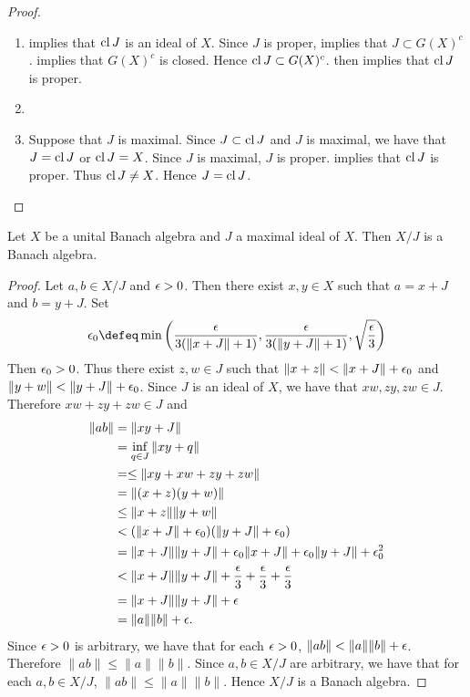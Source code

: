 \documentclass{book}
\begin{document}
	\begin{proof}\
		\begin{enumerate}
			\item {} \rex{} implies that $\operatorname{cl} J$ is an ideal of $X$. Since $J$ is proper,  \rex{} implies that $J \subset G(X)^c$.  implies that $G(X)^c$ is closed. Hence $\operatorname{cl} J \subset G(X)^c$.  \rex{} then implies that $\operatorname{cl} J$ is proper.
			\item \tcr{zorn's lemma FINISH!!!}
			\item Suppose that $J$ is maximal. Since $J \subset \operatorname{cl} J$ and $J$ is maximal, we have that $J = \operatorname{cl} J$ or $\operatorname{cl} J = X$. Since $J$ is maximal, $J$ is proper.  implies that $\operatorname{cl} J$ is proper. Thus $\operatorname{cl} J \neq X$. Hence $J = \operatorname{cl} J$.
		\end{enumerate}
	\end{proof}

	\begin{ex}
		Let $X$ be a unital Banach algebra and $J$ a maximal ideal of $X$. Then $X/J$ is a Banach algebra.
	\end{ex}

	\begin{proof}
		Let $a,b \in X/J$ and $\epsilon > 0$. Then there exist $x,y \in X$ such that $a = x+J$ and $b = y+J$. Set 
		$$\ep_0 \defeq \min \bigg( \frac{\ep}{3 (\|x + J\| + 1)}, \frac{\ep}{3 (\|y + J\| + 1)}, \sqrt{\frac{\ep}{3}} \bigg)$$ 
		Then $\epsilon_0 > 0$. Thus there exist $z,w \in J$ such that $\|x + z\| < \|x + J\| + \epsilon_0$ and $\|y + w\| < \|y + J\| + \epsilon_0$. Since $J$ is an ideal of $X$, we have that $xw, zy, zw \in J$. Therefore $xw + zy + zw \in J$ and 
		\begin{align*}
			\|ab\|
			& = \|xy + J\| \\
			& = \inf_{q \in J} \|xy + q \| \\
			& = \leq \|xy + xw + zy + zw \| \\
			& = \|(x + z)(y + w) \| \\
			& \leq \|x+z\| \|y+w\| \\
			& < (\|x + J\| + \epsilon_0) (\|y + J\| + \epsilon_0) \\
			& = \|x + J\| \|y + J\| + \epsilon_0\|x + J\| + \epsilon_0 \|y + J\| + \epsilon_0^2 \\
			& < \|x + J\| \|y + J\| + \frac{\epsilon}{3} + \frac{\epsilon}{3} + \frac{\epsilon}{3} \\
			& = \|x + J\| \|y + J\| + \epsilon \\
			& = \|a\| \|b\| + \epsilon. 
		\end{align*}
		Since $\epsilon > 0$ is arbitrary, we have that for each $\epsilon >0$, $\|ab\| < \|a\| \|b\| + \epsilon$. Therefore $\|ab\| \leq \|a\| \|b\|$. Since $a,b \in X/J$ are arbitrary, we have that for each $a,b \in X/J$, $\|ab\| \leq \|a\| \|b\|$. Hence $X/J$ is a Banach algebra.
	\end{proof}
\end{document}
